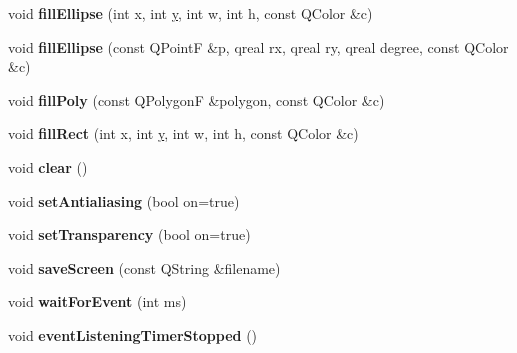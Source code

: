 \begin{DoxyCompactItemize}
\item 
\hypertarget{class_d_o_1_1_painting_window_a049b71d8961d194ebedfb090ca58680b}{void {\bfseries fill\-Ellipse} (int x, int \hyperlink{group___channel_accessors_gac90c52c5b3a7b2a7e3761e6e84f25778}{y}, int w, int h, const Q\-Color \&c)}\label{class_d_o_1_1_painting_window_a049b71d8961d194ebedfb090ca58680b}

\item 
\hypertarget{class_d_o_1_1_painting_window_abae47f4f659a578a13cd6a68a4dd64ba}{void {\bfseries fill\-Ellipse} (const Q\-Point\-F \&p, qreal rx, qreal ry, qreal degree, const Q\-Color \&c)}\label{class_d_o_1_1_painting_window_abae47f4f659a578a13cd6a68a4dd64ba}

\item 
\hypertarget{class_d_o_1_1_painting_window_a3bd68bbe82c6c705bf58f9e86ae5702c}{void {\bfseries fill\-Poly} (const Q\-Polygon\-F \&polygon, const Q\-Color \&c)}\label{class_d_o_1_1_painting_window_a3bd68bbe82c6c705bf58f9e86ae5702c}

\item 
\hypertarget{class_d_o_1_1_painting_window_a11e314c190027a1c4bf11d24027dfbd4}{void {\bfseries fill\-Rect} (int x, int \hyperlink{group___channel_accessors_gac90c52c5b3a7b2a7e3761e6e84f25778}{y}, int w, int h, const Q\-Color \&c)}\label{class_d_o_1_1_painting_window_a11e314c190027a1c4bf11d24027dfbd4}

\item 
\hypertarget{class_d_o_1_1_painting_window_ac8bb3912a3ce86b15842e79d0b421204}{void {\bfseries clear} ()}\label{class_d_o_1_1_painting_window_ac8bb3912a3ce86b15842e79d0b421204}

\item 
\hypertarget{class_d_o_1_1_painting_window_a012338601cb5f258cb9e10a11c15afea}{void {\bfseries set\-Antialiasing} (bool on=true)}\label{class_d_o_1_1_painting_window_a012338601cb5f258cb9e10a11c15afea}

\item 
\hypertarget{class_d_o_1_1_painting_window_ae29eab5ad5147b234c346bb7e3dbd425}{void {\bfseries set\-Transparency} (bool on=true)}\label{class_d_o_1_1_painting_window_ae29eab5ad5147b234c346bb7e3dbd425}

\item 
\hypertarget{class_d_o_1_1_painting_window_a476ff5751c04f3a88e037b396638dcbe}{void {\bfseries save\-Screen} (const Q\-String \&filename)}\label{class_d_o_1_1_painting_window_a476ff5751c04f3a88e037b396638dcbe}

\item 
\hypertarget{class_d_o_1_1_painting_window_a0fbc37525f0506f77256b69d5009eccf}{void {\bfseries wait\-For\-Event} (int ms)}\label{class_d_o_1_1_painting_window_a0fbc37525f0506f77256b69d5009eccf}

\item 
\hypertarget{class_d_o_1_1_painting_window_a8ca6be03a1706b85ffe8389dde2b771f}{void {\bfseries event\-Listening\-Timer\-Stopped} ()}\label{class_d_o_1_1_painting_window_a8ca6be03a1706b85ffe8389dde2b771f}

\end{DoxyCompactItemize}
